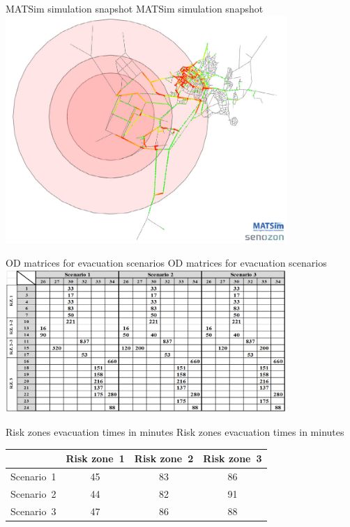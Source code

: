 \createfigure%
{MATSim simulation snapshot}%
{MATSim simulation snapshot}%
{\label{fig:aliaga_fig2}}%
{\includegraphics[width=0.8\textwidth, angle=0]{scenarios/figures/aliaga_fig2.png}}%
{}

\createfigure%
{OD matrices for evacuation scenarios}%
{OD matrices for evacuation scenarios}%
{\label{fig:aliaga_tab1}}%
{\includegraphics[width=0.8\textwidth, angle=0]{scenarios/figures/aliaga_tab1.png}}%
{}

\createtable%
{Risk zones evacuation times in minutes}%
{Risk zones evacuation times in minutes}%
{\label{tab:aliaga_tab2}}%
{%
  \begin{tabular}[c]{|l|c|c|c|}
    \hline
		& \textbf{Risk zone~1} & \textbf{Risk zone~2} & \textbf{Risk zone~3} \\
		\hline
    Scenario~1 & 45 & 83 & 86 \\
		Scenario~2 & 44 & 82 & 91 \\
		Scenario~3 & 47 & 86 & 88 \\
    \hline
  \end{tabular}
}%
{}

